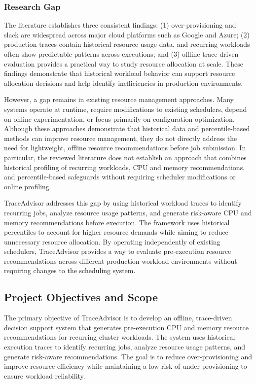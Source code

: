 \documentclass{IEEEtran}
\begin{document}
\subsubsection{Research Gap}

The literature establishes three consistent findings: (1) over-provisioning and slack are widespread across major cloud platforms such as Google and Azure; (2) production traces contain historical resource usage data, and recurring workloads often show predictable patterns across executions; and (3) offline trace-driven evaluation provides a practical way to study resource allocation at scale. These findings demonstrate that historical workload behavior can support resource allocation decisions and help identify inefficiencies in production environments.

However, a gap remains in existing resource management approaches. Many systems operate at runtime, require modifications to existing schedulers, depend on online experimentation, or focus primarily on configuration optimization. Although these approaches demonstrate that historical data and percentile-based methods can improve resource management, they do not directly address the need for lightweight, offline resource recommendations before job submission. In particular, the reviewed literature does not establish an approach that combines historical profiling of recurring workloads, CPU and memory recommendations, and percentile-based safeguards without requiring scheduler modifications or online profiling.

TraceAdvisor addresses this gap by using historical workload traces to identify recurring jobs, analyze resource usage patterns, and generate risk-aware CPU and memory recommendations before execution. The framework uses historical percentiles to account for higher resource demands while aiming to reduce unnecessary resource allocation. By operating independently of existing schedulers, TraceAdvisor provides a way to evaluate pre-execution resource recommendations across different production workload environments without requiring changes to the scheduling system.


\subsection{Project Objectives and Scope}

The primary objective of TraceAdvisor is to develop an offline, trace-driven decision support system that generates pre-execution CPU and memory resource recommendations for recurring cluster workloads. The system uses historical execution traces to identify recurring jobs, analyze resource usage patterns, and generate risk-aware recommendations. The goal is to reduce over-provisioning and improve resource efficiency while maintaining a low risk of under-provisioning to ensure workload reliability.
\end{document}
